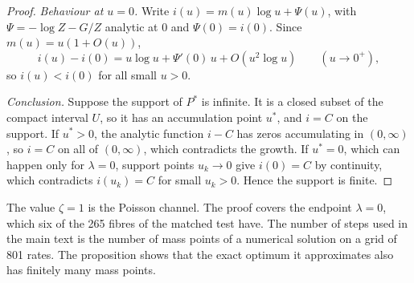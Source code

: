 \begin{proof}
\emph{Behaviour at $u=0$.} Write $i(u)=m(u)\log u+\Psi(u)$, with $\Psi=-\log Z-G/Z$ analytic at $0$ and $\Psi(0)=i(0)$. Since
$m(u)=u(1+O(u))$,
\[
i(u)-i(0)=u\log u+\Psi'(0)\,u+O(u^2\log u)\qquad(u\to0^+),
\]
so $i(u)<i(0)$ for all small $u>0$.

\emph{Conclusion.} Suppose the support of $P^*$ is infinite. It is a closed subset of the compact interval $U$, so it has an
accumulation point $u^*$, and $i=C$ on the support. If $u^*>0$, the analytic function $i-C$ has zeros accumulating in $(0,\infty)$,
so $i=C$ on all of $(0,\infty)$, which contradicts the growth. If $u^*=0$, which can happen only for $\lambda=0$, support points
$u_k\to0$ give $i(0)=C$ by continuity, which contradicts $i(u_k)=C$ for small $u_k>0$. Hence the support is finite.
\end{proof}

The value $\zeta=1$ is the Poisson channel. The proof covers the endpoint $\lambda=0$, which six of the 265 fibres of the matched test
have. The number of steps used in the main text is the number of mass points of a numerical solution on a grid of 801 rates. The
proposition shows that the exact optimum it approximates also has finitely many mass points.
